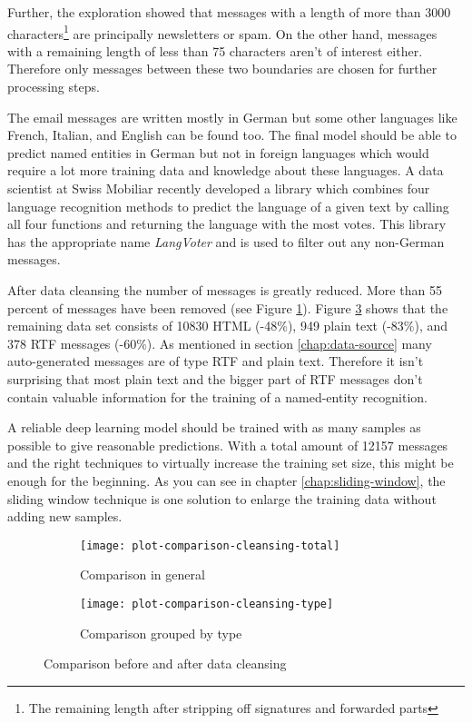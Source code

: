 Further, the exploration showed that messages with a length of more than 3000 characters\footnote{The remaining length after stripping off signatures and forwarded parts} are principally newsletters or spam. On the other hand, messages with a remaining length of less than 75 characters aren't of interest either. Therefore only messages between these two boundaries are chosen for further processing steps.

The email messages are written mostly in German but some other languages like French, Italian, and English can be found too. The final model should be able to predict named entities in German but not in foreign languages which would require a lot more training data and knowledge about these languages. A data scientist at Swiss Mobiliar recently developed a library which combines four language recognition methods to predict the language of a given text by calling all four functions and returning the language with the most votes. This library has the appropriate name
\emph{LangVoter} and is used to filter out any non-German messages.

After data cleansing the number of messages is greatly reduced. More than 55 percent of messages have been removed (see Figure \ref{fig:plot-comparison-cleansing}). Figure \ref{fig:plot-comparison-cleansing-types} shows that the remaining data set consists of 10830 HTML (-48\%), 949 plain text (-83\%), and 378 RTF messages (-60\%). As mentioned in section \ref{chap:data-source} many auto-generated messages are of type RTF and plain text. Therefore it isn't surprising that most plain text and the bigger part of RTF messages don't contain valuable information for the training of a named-entity recognition.

A reliable deep learning model should be trained with as many samples as possible to give reasonable predictions. With a total amount of 12157 messages and the right techniques to virtually increase the training set size, this might be enough for the beginning. As you can see in chapter \ref{chap:sliding-window}, the sliding window technique is one solution to enlarge the training data without adding new samples.

\begin{figure}[ht!]
    \begin{subfigure}{0.5\textwidth}
        \texttt{[image: plot-comparison-cleansing-total]}
        \caption{Comparison in general}
        \label{fig:plot-comparison-cleansing}
    \end{subfigure}
    \begin{subfigure}{0.5\textwidth}
        \texttt{[image: plot-comparison-cleansing-type]}
        \caption{Comparison grouped by type}
        \label{fig:plot-comparison-cleansing-types}
    \end{subfigure}
    \caption{Comparison before and after data cleansing}
\end{figure}

